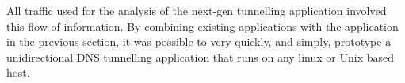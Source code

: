 \documentclass[12pt]{report}
\theoremstyle{remark}
\theoremstyle{definition}
\theoremstyle{definition}
\theoremstyle{definition}
\begin{document}
\begin{appendices}
All traffic used for the analysis of the next-gen tunnelling application
involved this flow of information. By combining existing applications with the
application in the previous section, it was possible to very quickly, and
simply, prototype a unidirectional DNS tunnelling application that runs on any
linux or Unix based host.

\end{appendices}

\newpage
{}

%
%
\end{document}
